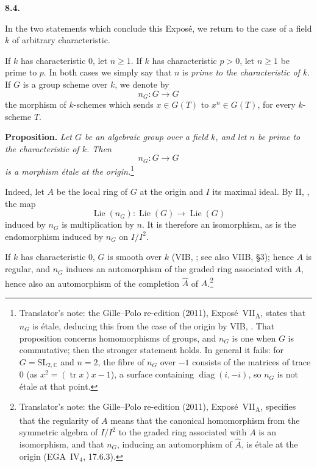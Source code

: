 
\medskip
\noindent\textbf{8.4.}
\label{sga3:VIIA:8.4}

In the two statements which conclude this Expos\'e, we return to
the case of a field \(k\) of arbitrary characteristic.

If \(k\) has characteristic \(0\), let \(n\ge1\). If \(k\) has
characteristic \(p>0\), let \(n\ge1\) be prime to \(p\). In both
cases we simply say that \(n\) is \emph{prime to the
characteristic of \(k\)}. If \(G\) is a group scheme over \(k\),
we denote by
\[
  n_G:G\longrightarrow G
\]
the morphism of \(k\)-schemes which sends
\(x\in G(T)\) to \(x^n\in G(T)\), for every \(k\)-scheme \(T\).

\medskip
\noindent\textbf{Proposition.}
\label{sga3:VIIA:8.4-proposition}
\textit{Let \(G\) be an algebraic group over a field \(k\), and
let \(n\) be prime to the characteristic of \(k\). Then
\[
  n_G:G\longrightarrow G
\]
is a morphism \'etale at the origin.}\footnote{Translator's note: the
Gille--Polo re-edition (2011), Expos\'e~VII\textsubscript{A}, states that
\(n_G\) is \'etale, deducing this from the case of the origin by VIB,
. That proposition concerns homomorphisms of groups, and \(n_G\) is one
when \(G\) is commutative; then the stronger statement holds. In general
it fails: for \(G=\mathrm{SL}_{2,\mathbb C}\) and \(n=2\), the fibre of
\(n_G\) over \(-1\) consists of the matrices of trace \(0\) (as
\(x^2=(\operatorname{tr}x)x-1\)), a surface containing
\(\operatorname{diag}(i,-i)\), so \(n_G\) is not \'etale at that point.}

Indeed, let \(A\) be the local ring of \(G\) at the origin and \(I\) its
maximal ideal. By II, , the map
\[
  \operatorname{Lie}(n_G):
  \operatorname{Lie}(G)\longrightarrow\operatorname{Lie}(G)
\]
induced by \(n_G\) is multiplication by \(n\). It is therefore an
isomorphism, as is the endomorphism induced by \(n_G\) on \(I/I^2\).

If \(k\) has characteristic \(0\), \(G\) is smooth over \(k\) (VIB,
; see also VIIB, \S3); hence \(A\) is regular, and \(n_G\) induces an
automorphism of the graded ring associated with \(A\), hence also an
automorphism of the completion \(\widehat A\) of \(A\).\footnote{Translator's
note: the Gille--Polo re-edition (2011), Expos\'e~VII\textsubscript{A},
specifies that the regularity of \(A\) means that the canonical
homomorphism from the symmetric algebra of \(I/I^2\) to the graded ring
associated with \(A\) is an isomorphism, and that \(n_G\), inducing an
automorphism of \(\widehat A\), is \'etale at the origin
(EGA~IV\(_4\), 17.6.3).}

